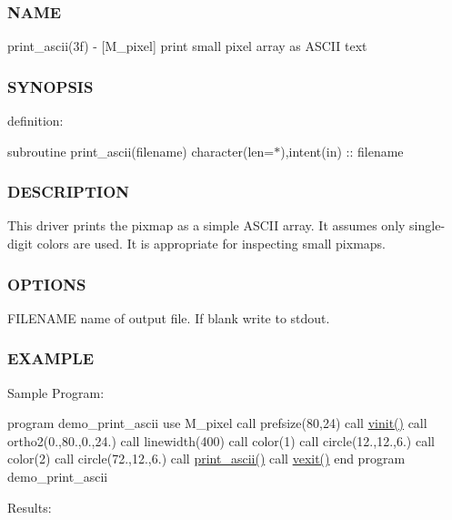 \subsubsection*{N\+A\+ME}

print\+\_\+ascii(3f) -\/ \mbox{[}M\+\_\+pixel\mbox{]} print small pixel array as A\+S\+C\+II text 

\subsubsection*{S\+Y\+N\+O\+P\+S\+IS}

definition\+:

subroutine print\+\_\+ascii(filename) character(len=$\ast$),intent(in) \+:\+: filename

\subsubsection*{D\+E\+S\+C\+R\+I\+P\+T\+I\+ON}

This driver prints the pixmap as a simple A\+S\+C\+II array. It assumes only single-\/digit colors are used. It is appropriate for inspecting small pixmaps.

\subsubsection*{O\+P\+T\+I\+O\+NS}

F\+I\+L\+E\+N\+A\+ME name of output file. If blank write to stdout.

\subsubsection*{E\+X\+A\+M\+P\+LE}

Sample Program\+:

program demo\+\_\+print\+\_\+ascii use M\+\_\+pixel call prefsize(80,24) call \hyperlink{namespacem__pixel_ac03ca8f23fdadb60599b6ea4dc87a6d9}{vinit()} call ortho2(0.,80.,0.,24.) call linewidth(400) call color(1) call circle(12.,12.,6.) call color(2) call circle(72.,12.,6.) call \hyperlink{namespacem__pixel_ab2bb47aea567667b1b92c8265bcb36fb}{print\+\_\+ascii()} call \hyperlink{namespacem__pixel_a19ad6b65752322b0029a62cc0ebec3e8}{vexit()} end program demo\+\_\+print\+\_\+ascii

Results\+:

